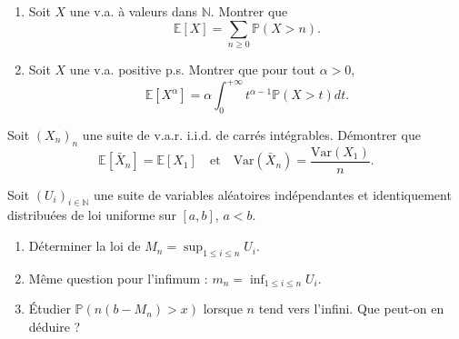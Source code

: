 \smallskip

\begin{mdframed}
\begin{exercice}
\begin{enumerate}
    \item Soit $X$ une v.a. à valeurs dans $\mathbb{N}$. Montrer que
    \begin{equation*}
    \mathbb{E}[X] = \sum_{n \ge 0} \mathbb{P}(X > n).
    \end{equation*}
    \item Soit $X$ une v.a. positive p.s. Montrer que pour tout $\alpha > 0$,
    \begin{equation*}
    \mathbb{E}[X^\alpha] = \alpha \int_0^{+\infty} t^{\alpha-1} \mathbb{P}(X > t) dt.
    \end{equation*}
\end{enumerate}
\end{exercice}
\end{mdframed}

\smallskip

\begin{mdframed}
\begin{exercice}
Soit $(X_n)_n$ une suite de v.a.r. i.i.d. de carrés intégrables. Démontrer que
\begin{equation*}
\mathbb{E}[\bar{X}_n] = \mathbb{E}[X_1] \quad \text{et} \quad \text{Var}(\bar{X}_n) = \frac{\text{Var}(X_1)}{n}.
\end{equation*}
\end{exercice}
\end{mdframed}

\smallskip

\begin{mdframed}
\begin{exercice}
Soit $(U_i)_{i \in \mathbb{N}}$ une suite de variables aléatoires indépendantes et identiquement distribuées de loi uniforme sur $[a, b]$, $a < b$.
\begin{enumerate}
    \item Déterminer la loi de $M_n = \sup_{1 \le i \le n} U_i$.
    \item Même question pour l'infimum : $m_n = \inf_{1 \le i \le n} U_i$.
    \item Étudier $\mathbb{P}(n(b - M_n) > x)$ lorsque $n$ tend vers l'infini. Que peut-on en déduire ?
\end{enumerate}
\end{exercice}
\end{mdframed}

